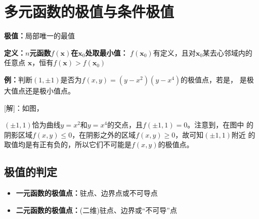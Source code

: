 \section{多元函数的极值与条件极值}

{\bf 极值：}局部唯一的最值

{\bf 定义：}{\bf $n$元函数$f(\bm{x})$在$\bm{x}_0$处取最小值：}
$f(\bm{x}_0)$有定义，且对$\bm{x}_0$某去心邻域内的任意点
$\bm{x}$，恒有$f(\bm{x})>f(\bm{x}_0)$

% 	

{\bf 例：}判断$(1,\pm1)$是否为$f(x,y)=(y-x^2)(y-x^4)$的极值点，若是，
是极大值点还是极小值点。


[解]：如图，
\begin{center}
\end{center}
$(\pm1,1)$恰为曲线$y=x^2$和$y=x^4$的交点，且$f(\pm1,1)=0$。注意到，在图中
的阴影区域$f(x,y)\leq0$，在阴影之外的区域$f(x,y)\geq0$，故可知$(\pm1,1)$附近
的取值均是有正有负的，所以它们不可能是$f(x,y)$的极值点。

\subsection{极值的判定}

\begin{itemize}
  \item {\bf 一元函数的极值点：}驻点、边界点或不可导点 
  \item {\bf 二元函数的极值点：}(二维)驻点、边界或“不可导”点 
\end{itemize}


